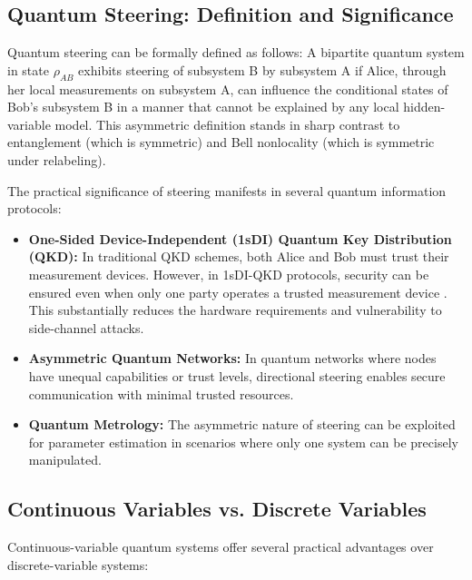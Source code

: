 \subsection{Quantum Steering: Definition and Significance}

Quantum steering can be formally defined as follows: A bipartite quantum system in state $\rho_{AB}$ exhibits steering of subsystem B by subsystem A if Alice, through her local measurements on subsystem A, can influence the conditional states of Bob's subsystem B in a manner that cannot be explained by any local hidden-variable model. This asymmetric definition stands in sharp contrast to entanglement (which is symmetric) and Bell nonlocality (which is symmetric under relabeling).

The practical significance of steering manifests in several quantum information protocols:

\begin{itemize}
	\item \textbf{One-Sided Device-Independent (1sDI) Quantum Key Distribution (QKD):} In traditional QKD schemes, both Alice and Bob must trust their measurement devices. However, in 1sDI-QKD protocols, security can be ensured even when only one party operates a trusted measurement device \cite{BranciardC12}. This substantially reduces the hardware requirements and vulnerability to side-channel attacks.

	\item \textbf{Asymmetric Quantum Networks:} In quantum networks where nodes have unequal capabilities or trust levels, directional steering enables secure communication with minimal trusted resources.

	\item \textbf{Quantum Metrology:} The asymmetric nature of steering can be exploited for parameter estimation in scenarios where only one system can be precisely manipulated.
\end{itemize}

\subsection{Continuous Variables vs. Discrete Variables}

Continuous-variable quantum systems offer several practical advantages over discrete-variable systems:

